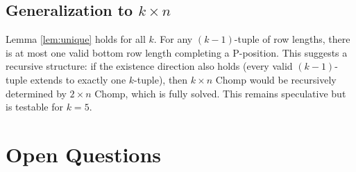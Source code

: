 \documentclass[12pt]{article}
\begin{document}
\subsection{Generalization to $k \times n$}

Lemma \ref{lem:unique} holds for all $k$. For any $(k-1)$-tuple of
row lengths, there is at most one valid bottom row length completing
a P-position. This suggests a recursive structure: if the existence
direction also holds (every valid $(k-1)$-tuple extends to exactly
one $k$-tuple), then $k \times n$ Chomp would be recursively determined
by $2 \times n$ Chomp, which is fully solved. This remains speculative
but is testable for $k = 5$.

\section{Open Questions}
\end{document}
